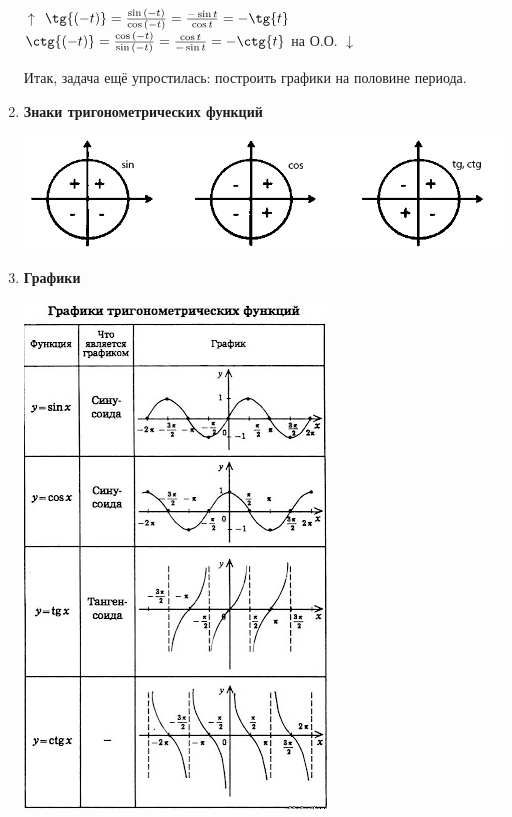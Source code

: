 \documentclass{article}
\begin{document}
\begin{enumerate}
            \(\uparrow\) \(\tg{(-t)} = \frac{\sin{(-t)}}{\cos{(-t)}} = \frac{-\sin{t}}{\cos{t}} = -\tg{t}\) \(\ctg{(-t)} = \frac{\cos{(-t)}}{\sin{(-t)}} = \frac{\cos{t}}{-\sin{t}} = -\ctg{t}\) на О.О. \(\downarrow\)
            
            Итак, задача ещё упростилась: построить графики на половине периода.
            
            \item \textbf{Знаки тригонометрических функций}
            
            \includegraphics[scale=0.4]{1}
            
            \item \textbf{Графики}
            
            \begin{center}
                \includegraphics[scale=0.9]{2}
            \end{center}
            
        \end{enumerate}
        
\end{document}
